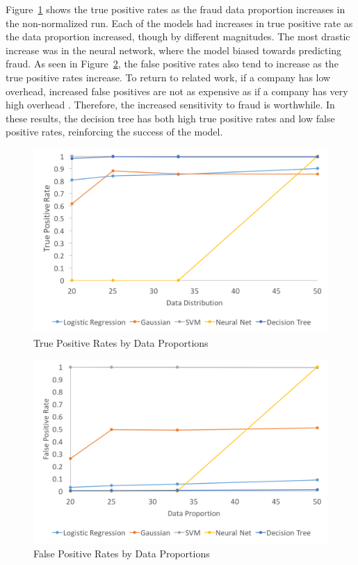 \documentclass[midd]{thesis}
\begin{document}
Figure~\ref{fig:tpr} shows the true positive rates as the fraud data proportion increases in the non-normalized run. Each of the models had increases in true positive rate as the data proportion increased, though by different magnitudes. The most drastic increase was in the neural network, where the model biased towards predicting fraud. As seen in Figure~\ref{fig:fpr}, the false positive rates also tend to increase as the true positive rates increase. To return to related work, if a company has low overhead, increased false positives are not as expensive as if a company has very high overhead \cite{Chan}. Therefore, the increased sensitivity to fraud is worthwhile. In these results, the decision tree has both high true positive rates and low false positive rates, reinforcing the success of the model.   

\begin{figure} \centering
  \includegraphics[scale=.6]{tpr.png}
  \caption{True Positive Rates by Data Proportions}
  \label{fig:tpr}
\end{figure}

\begin{figure} \centering
  \includegraphics[scale=.6]{fpr.png}
  \caption{False Positive Rates by Data Proportions}
  \label{fig:fpr}
\end{figure}
\end{document}
